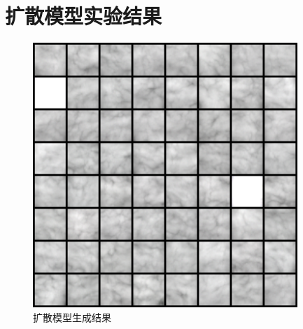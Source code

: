 \section{扩散模型实验结果}
\begin{figure}[!htbp]
    \centering
    \includegraphics[width=10cm]{image/chap04/Diffusion/linearnoise_image.png}
    \caption{扩散模型生成结果}
    \label{fig:DCGAN_img}
\end{figure}
